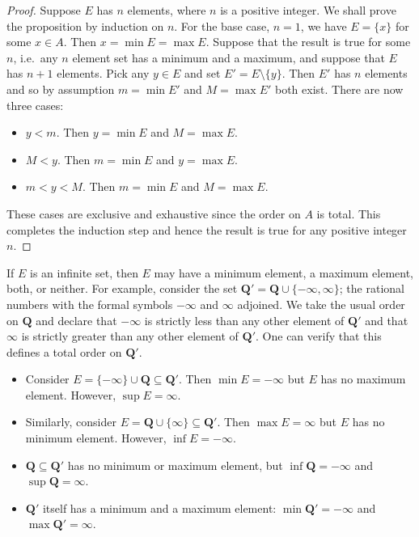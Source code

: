\documentclass[12pt]{article}
\theoremstyle{definition}
\newcommand{\Q}{\mathbf{Q}}
\begin{document}
\begin{proof}
    Suppose \( E \) has \( n \) elements, where \( n \) is a positive integer. We shall prove the proposition by induction on \( n \). For the base case, \( n = 1 \), we have \( E = \{ x \} \) for some \( x \in A \). Then \( x = \min E = \max E \). Suppose that the result is true for some \( n \), i.e.\ any \( n \) element set has a minimum and a maximum, and suppose that \( E \) has \( n + 1 \) elements. Pick any \( y \in E \) and set \( E' = E \setminus \{ y \} \). Then \( E' \) has \( n \) elements and so by assumption \( m = \min E' \) and \( M = \max E' \) both exist. There are now three cases:
    \begin{itemize}
        \item \( y < m \). Then \( y = \min E \) and \( M = \max E \).

        \item \( M < y \). Then \( m = \min E \) and \( y = \max E \).

        \item \( m < y < M \). Then \( m = \min E \) and \( M = \max E \).
    \end{itemize}

    These cases are exclusive and exhaustive since the order on \( A \) is total. This completes the induction step and hence the result is true for any positive integer \( n \).
\end{proof}

If \( E \) is an infinite set, then \( E \) may have a minimum element, a maximum element, both, or neither. For example, consider the set \( \Q' = \Q \cup \{ -\infty, \infty \} \); the rational numbers with the formal symbols \( -\infty \) and \( \infty \) adjoined. We take the usual order on \( \Q \) and declare that \( -\infty \) is strictly less than any other element of \( \Q' \) and that \( \infty \) is strictly greater than any other element of \( \Q' \). One can verify that this defines a total order on \( \Q' \).

\begin{itemize}
    \item Consider \( E = \{ -\infty \} \cup \Q \subseteq \Q' \). Then \( \min E = -\infty \) but \( E \) has no maximum element. However, \( \sup E = \infty \).

    \item Similarly, consider \( E = \Q \cup \{ \infty \} \subseteq \Q' \). Then \( \max E = \infty \) but \( E \) has no minimum element. However, \( \inf E = -\infty \).

    \item \( \Q \subseteq \Q' \) has no minimum or maximum element, but \( \inf \Q = -\infty \) and \( \sup \Q = \infty \).

    \item \( \Q' \) itself has a minimum and a maximum element: \( \min \Q' = -\infty \) and \( \max \Q' = \infty \).
\end{itemize}
 
\end{document}
